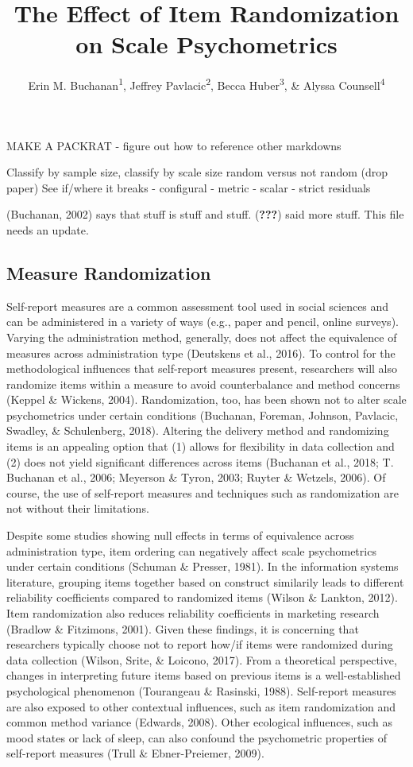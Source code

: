 \documentclass[man,draftall]{apa6}
\affiliation{
\vspace{0.5cm}
\textsuperscript{1} Harrisburg University of Science and Technology\\\textsuperscript{2} University of Mississippi\\\textsuperscript{3} Idaho State University\\\textsuperscript{4} Ryerson University}
\title{The Effect of Item Randomization on Scale Psychometrics}
\author{Erin M. Buchanan\textsuperscript{1}, Jeffrey Pavlacic\textsuperscript{2}, Becca Huber\textsuperscript{3}, \& Alyssa Counsell\textsuperscript{4}}
\date{}
\begin{document}
\maketitle

MAKE A PACKRAT
- figure out how to reference other markdowns

Classify by sample size, classify by scale size
random versus not random (drop paper)
See if/where it breaks
- configural
- metric
- scalar
- strict residuals

(Buchanan, 2002) says that stuff is stuff and stuff. ({\textbf{???}}) said more stuff. This file needs an update.

\hypertarget{measure-randomization}{%
\subsection{Measure Randomization}\label{measure-randomization}}

Self-report measures are a common assessment tool used in social sciences and can be administered in a variety of ways (e.g., paper and pencil, online surveys). Varying the administration method, generally, does not affect the equivalence of measures across administration type (Deutskens et al., 2016). To control for the methodological influences that self-report measures present, researchers will also randomize items within a measure to avoid counterbalance and method concerns (Keppel \& Wickens, 2004). Randomization, too, has been shown not to alter scale psychometrics under certain conditions (Buchanan, Foreman, Johnson, Pavlacic, Swadley, \& Schulenberg, 2018). Altering the delivery method and randomizing items is an appealing option that (1) allows for flexibility in data collection and (2) does not yield significant differences across items (Buchanan et al., 2018; T. Buchanan et al., 2006; Meyerson \& Tyron, 2003; Ruyter \& Wetzels, 2006). Of course, the use of self-report measures and techniques such as randomization are not without their limitations.

Despite some studies showing null effects in terms of equivalence across administration type, item ordering can negatively affect scale psychometrics under certain conditions (Schuman \& Presser, 1981). In the information systems literature, grouping items together based on construct similarily leads to different reliability coefficients compared to randomized items (Wilson \& Lankton, 2012). Item randomization also reduces reliability coefficients in marketing research (Bradlow \& Fitzimons, 2001). Given these findings, it is concerning that researchers typically choose not to report how/if items were randomized during data collection (Wilson, Srite, \& Loicono, 2017). From a theoretical perspective, changes in interpreting future items based on previous items is a well-established psychological phenomenon (Tourangeau \& Rasinski, 1988). Self-report measures are also exposed to other contextual influences, such as item randomization and common method variance (Edwards, 2008). Other ecological influences, such as mood states or lack of sleep, can also confound the psychometric properties of self-report measures (Trull \& Ebner-Preiemer, 2009).
\end{document}
